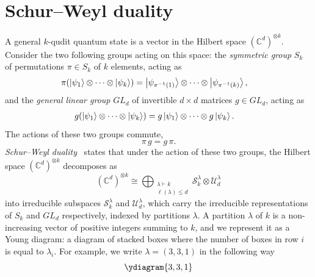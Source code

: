 \documentclass[11pt,a4paper]{report}
\newcommand{\ot}{\otimes}
\newcommand{\C}{\mathds{C}}
\newcommand{\cdk}{(\C^d)^{\otimes k}}
\begin{document}
\section{Schur--Weyl duality}\label{ch:schurweyl}
A general $k$-qudit quantum state is a vector in the Hilbert space $\cdk$. Consider the two following groups acting on this space: the \emph{symmetric group} $S_k$ of permutations $\pi\in S_k$ of $k$ elements, acting as
\begin{align}
    \pi (\ket{\psi_1} \ot \dots \ot \ket{\psi_k}) &= \ket{\psi_{\pi^{-1}(1)}} \ot \dots \ot \ket{\psi_{\pi^{-1}(k)}},
\end{align}
and the \emph{general linear group} $GL_d$ of invertible $d\times d$ matrices $g\in GL_d$, acting as
\begin{align}
g(\ket{\psi_1} \ot \dots \ot \ket{\psi_k}) &=g\ket{\psi_1} \ot \dots \ot g\ket{\psi_k}.
\end{align}
The actions of these two groups commute,
\begin{equation}\label{eq:PerUniCommute}
    \pi \, g = g \, \pi.
\end{equation}
\emph{Schur--Weyl duality}~\cite{fulton2013representation} states that under the action of these two groups, the Hilbert space $\cdk$ decomposes as
\begin{equation}
    \cdk \cong \bigoplus_{\substack{\lambda\vdash k \\ \ell(\lambda)\leq d}} \mathcal{S}^\lambda_k \ot \mathcal{U}^\lambda_d
\end{equation}
into irreducible subspaces $\mathcal{S}^\lambda_k$ and $\mathcal{U}^\lambda_d$, which carry the irreducible representations
of $S_k$ and $GL_d$ respectively, indexed by partitions $\lambda$. A partition $\lambda$ of $k$ is a non-increasing vector of positive integers summing to $k$, and we represent it as a Young diagram: a diagram of stacked boxes where the number of boxes in row $i$ is equal to $\lambda_i$. For example, we write $\lambda=(3,3,1)$ in the following way
\begin{equation}
    \ydiagram{3,3,1}
\end{equation}
\end{document}
